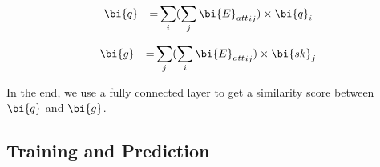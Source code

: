 \begin{equation}
\label{eqn:att-q}
\begin{aligned}
& \bi{q} & = & \sum_{i}(\sum_{j}{\bi{E}_{att}}_{ij}) \times \bi{q}_i\\
\end{aligned}
\end{equation}
\noindent

\begin{equation}
\label{eqn:att-g}
\begin{aligned}
& \bi{g} & = & \sum_{j}(\sum_{i}{\bi{E}_{att}}_{ij}) \times \bi{sk}_j\\
\end{aligned}
\end{equation}
\noindent

In the end, we use a fully connected layer to get a similarity score between $\bi{q}$ and $\bi{g}$.



\subsection{Training and Prediction}
\label{sec:training}






